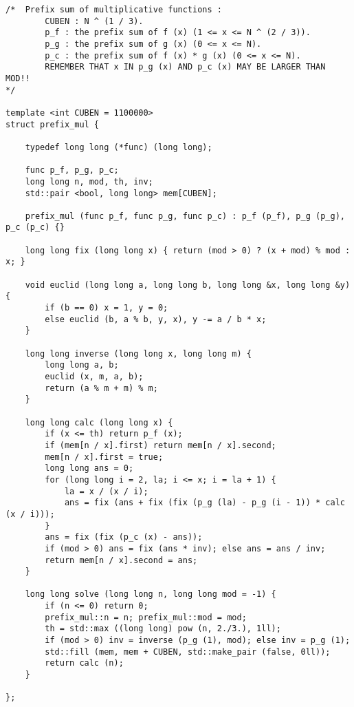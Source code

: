 \begin{lstlisting}
/*	Prefix sum of multiplicative functions :
		CUBEN : N ^ (1 / 3).
		p_f : the prefix sum of f (x) (1 <= x <= N ^ (2 / 3)).
		p_g : the prefix sum of g (x) (0 <= x <= N).
		p_c : the prefix sum of f (x) * g (x) (0 <= x <= N).
		REMEMBER THAT x IN p_g (x) AND p_c (x) MAY BE LARGER THAN MOD!!
*/

template <int CUBEN = 1100000>
struct prefix_mul {

	typedef long long (*func) (long long);

	func p_f, p_g, p_c;
	long long n, mod, th, inv;
	std::pair <bool, long long> mem[CUBEN];

	prefix_mul (func p_f, func p_g, func p_c) : p_f (p_f), p_g (p_g), p_c (p_c) {}

	long long fix (long long x) { return (mod > 0) ? (x + mod) % mod : x; }

	void euclid (long long a, long long b, long long &x, long long &y) {
		if (b == 0) x = 1, y = 0;
		else euclid (b, a % b, y, x), y -= a / b * x;
	}

	long long inverse (long long x, long long m) {
		long long a, b;
		euclid (x, m, a, b);
		return (a % m + m) % m;
	}

	long long calc (long long x) {
		if (x <= th) return p_f (x);
		if (mem[n / x].first) return mem[n / x].second;
		mem[n / x].first = true;
		long long ans = 0;
		for (long long i = 2, la; i <= x; i = la + 1) {
			la = x / (x / i);
			ans = fix (ans + fix (fix (p_g (la) - p_g (i - 1)) * calc (x / i)));
		}
		ans = fix (fix (p_c (x) - ans));
		if (mod > 0) ans = fix (ans * inv); else ans = ans / inv;
		return mem[n / x].second = ans;
	}

	long long solve (long long n, long long mod = -1) {
		if (n <= 0) return 0;
		prefix_mul::n = n; prefix_mul::mod = mod;
		th = std::max ((long long) pow (n, 2./3.), 1ll);
		if (mod > 0) inv = inverse (p_g (1), mod); else inv = p_g (1);
		std::fill (mem, mem + CUBEN, std::make_pair (false, 0ll));
		return calc (n); 
	}

};
\end{lstlisting}

